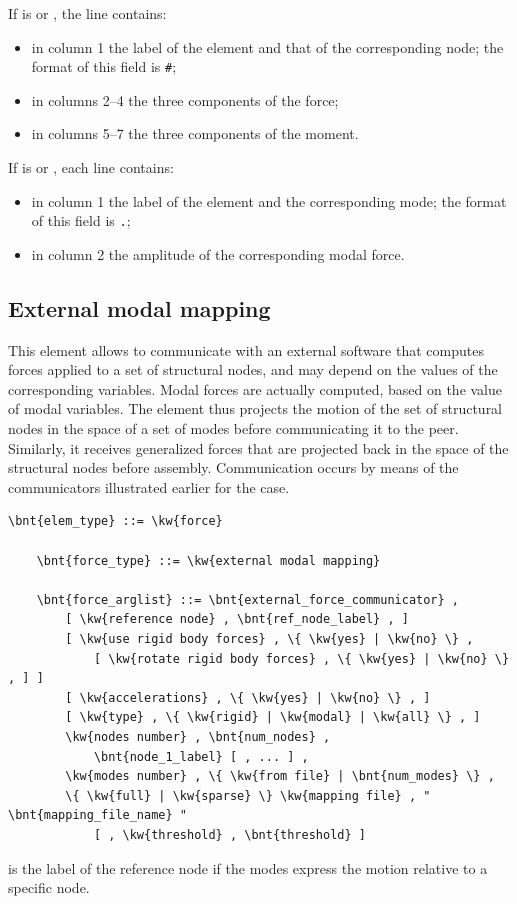 If  is  or , the line contains:
\begin{itemize}
\item in column 1 the label of the element and that of the corresponding node;
	the format of this field is \texttt{\#};
\item in columns 2--4 the three components of the force;
\item in columns 5--7 the three components of the moment.
\end{itemize}
If  is  or , each line contains:
\begin{itemize}
\item in column 1 the label of the element and the corresponding mode;
	the format of this field is \texttt{.};
\item in column 2 the amplitude of the corresponding modal force.
\end{itemize}



\subsection{External modal mapping}
\label{sec:EL:FORCE:EXTERNAL:MODAL_MAPPING}
This element allows to communicate with an external software that computes
forces applied to a set of structural nodes,
and may depend on the values of the corresponding variables.
Modal forces are actually computed, based on the value of modal variables.
The element thus projects the motion of the set of structural nodes
in the space of a set of modes before communicating it to the peer.
Similarly, it receives generalized forces that are projected back
in the space of the structural nodes before assembly.
Communication occurs by means of the communicators illustrated earlier
for the  case.
\begin{Verbatim}[commandchars=\\\{\}]
    \bnt{elem_type} ::= \kw{force}

    \bnt{force_type} ::= \kw{external modal mapping}

    \bnt{force_arglist} ::= \bnt{external_force_communicator} ,
        [ \kw{reference node} , \bnt{ref_node_label} , ]
        [ \kw{use rigid body forces} , \{ \kw{yes} | \kw{no} \} ,
            [ \kw{rotate rigid body forces} , \{ \kw{yes} | \kw{no} \} , ] ]
        [ \kw{accelerations} , \{ \kw{yes} | \kw{no} \} , ]
        [ \kw{type} , \{ \kw{rigid} | \kw{modal} | \kw{all} \} , ]
        \kw{nodes number} , \bnt{num_nodes} ,
            \bnt{node_1_label} [ , ... ] ,
        \kw{modes number} , \{ \kw{from file} | \bnt{num_modes} \} ,
        \{ \kw{full} | \kw{sparse} \} \kw{mapping file} , " \bnt{mapping_file_name} "
            [ , \kw{threshold} , \bnt{threshold} ]
\end{Verbatim}
 is the label of the reference node
if the modes express the motion relative to a specific node.

